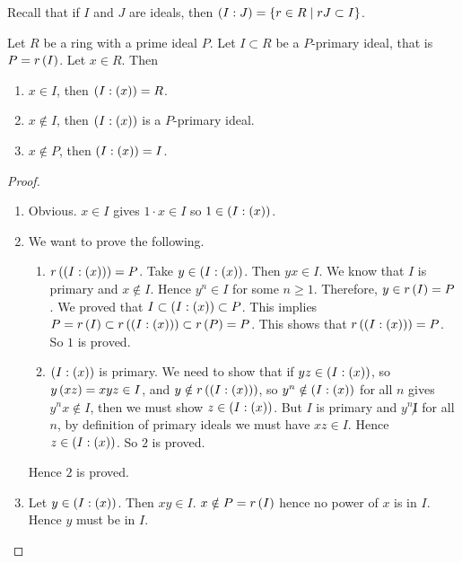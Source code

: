 Recall that if $ I $ and $ J $ are ideals, then $ \left( I : J \right) = \left\{ r \in R \mid rJ \subset I \right\} $.

\begin{lemma}
\label{lem:11.7}
Let $ R $ be a ring with a prime ideal $ P $. Let $ I \subset R $ be a $ P $-primary ideal, that is $ P = r\left( I \right) $. Let $ x \in R $. Then
\begin{enumerate}
\item $ x \in I $, then $ \left( I : \left( x \right) \right) = R $.
\item $ x \notin I $, then $ \left( I : \left( x \right) \right) $ is a $ P $-primary ideal.
\item $ x \notin P $, then $ \left( I : \left( x \right) \right) = I $.
\end{enumerate}
\end{lemma}


\begin{proof}
\hfill
\begin{enumerate}
\item Obvious. $ x \in I $ gives $ 1 \cdot x \in I $ so $ 1 \in \left( I : \left( x \right) \right) $.
\item We want to prove the following.
\begin{enumerate}
\item $ r\left( \left( I : \left( x \right) \right) \right) = P $. Take $ y \in \left( I : \left( x \right) \right) $. Then $ yx \in I $. We know that $ I $ is primary and $ x \notin I $. Hence $ y^n \in I $ for some $ n \ge 1 $. Therefore, $ y \in r\left( I \right) = P $. We proved that $ I \subset \left( I : \left( x \right) \right) \subset P $. This implies $ P = r\left( I \right) \subset r\left( \left( I : \left( x \right) \right) \right) \subset r\left( P \right) = P $. This shows that $ r\left( \left( I : \left( x \right) \right) \right) = P $. So $ 1 $ is proved.
\item $ \left( I : \left( x \right) \right) $ is primary. We need to show that if $ yz \in \left( I : \left( x \right) \right) $, so $ y\left( xz \right) = xyz \in I $, and $ y \notin r\left( \left( I : \left( x \right) \right) \right) $, so $ y^n \notin \left( I : \left( x \right) \right) $ for all $ n $ gives $ y^nx \notin I $, then we must show $ z \in \left( I : \left( x \right) \right) $. But $ I $ is primary and $ y^n \not I $ for all $ n $, by definition of primary ideals we must have $ xz \in I $. Hence $ z \in \left( I : \left( x \right) \right) $. So $ 2 $ is proved.
\end{enumerate}
Hence $ 2 $ is proved.
\item Let $ y \in \left( I : \left( x \right) \right) $. Then $ xy \in I $. $ x \notin P = r\left( I \right) $ hence no power of $ x $ is in $ I $. Hence $ y $ must be in $ I $.
\end{enumerate}
\end{proof}

